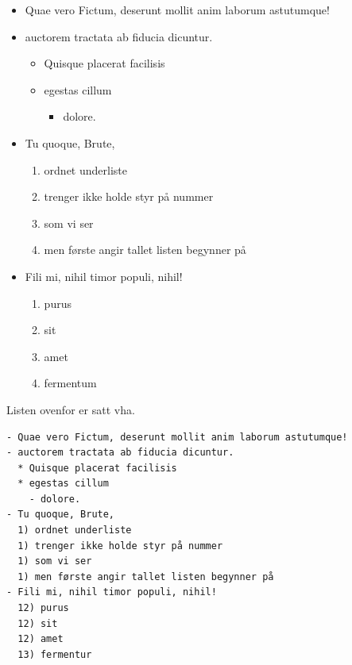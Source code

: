 \documentclass[
]{article}
\providecommand{\tightlist}{%
  \setlength{\itemsep}{0pt}\setlength{\parskip}{0pt}}
\begin{document}
\begin{itemize}
\item
  Quae vero Fictum, deserunt mollit anim laborum astutumque!
\item
  auctorem tractata ab fiducia dicuntur.

  \begin{itemize}
  \item
    Quisque placerat facilisis
  \item
    egestas cillum

    \begin{itemize}
    \tightlist
    \item
      dolore.
    \end{itemize}
  \end{itemize}
\item
  Tu quoque, Brute,

  \begin{enumerate}
  \def\labelenumi{\arabic{enumi})}
  \tightlist
  \item
    ordnet underliste
  \item
    trenger ikke holde styr på nummer
  \item
    som vi ser
  \item
    men første angir tallet listen begynner på
  \end{enumerate}
\item
  Fili mi, nihil timor populi, nihil!

  \begin{enumerate}
  \def\labelenumi{\arabic{enumi})}
  \setcounter{enumi}{11}
  \tightlist
  \item
    purus
  \item
    sit
  \item
    amet
  \item
    fermentum
  \end{enumerate}
\end{itemize}

Listen ovenfor er satt vha.

\begin{verbatim}
- Quae vero Fictum, deserunt mollit anim laborum astutumque!
- auctorem tractata ab fiducia dicuntur.
  * Quisque placerat facilisis 
  * egestas cillum 
    - dolore.
- Tu quoque, Brute, 
  1) ordnet underliste
  1) trenger ikke holde styr på nummer
  1) som vi ser
  1) men første angir tallet listen begynner på
- Fili mi, nihil timor populi, nihil!
  12) purus 
  12) sit 
  12) amet 
  13) fermentur
  
  
\end{verbatim}
\end{document}
